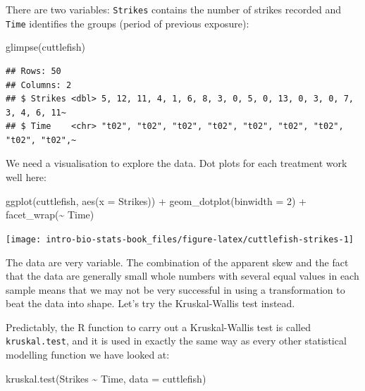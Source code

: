 \documentclass[
]{book}
\newenvironment{Shaded}{\begin{snugshade}}{\end{snugshade}}
\newcommand{\AttributeTok}[1]{\textcolor[rgb]{0.77,0.63,0.00}{#1}}
\newcommand{\DecValTok}[1]{\textcolor[rgb]{0.00,0.00,0.81}{#1}}
\newcommand{\FunctionTok}[1]{\textcolor[rgb]{0.00,0.00,0.00}{#1}}
\newcommand{\NormalTok}[1]{#1}
\newcommand{\SpecialCharTok}[1]{\textcolor[rgb]{0.00,0.00,0.00}{#1}}
\begin{document}
There are two variables: \texttt{Strikes} contains the number of strikes recorded and \texttt{Time} identifies the groups (period of previous exposure):

\begin{Shaded}
\begin{Highlighting}[]
\FunctionTok{glimpse}\NormalTok{(cuttlefish)}
\end{Highlighting}
\end{Shaded}

\begin{verbatim}
## Rows: 50
## Columns: 2
## $ Strikes <dbl> 5, 12, 11, 4, 1, 6, 8, 3, 0, 5, 0, 13, 0, 3, 0, 7, 3, 4, 6, 11~
## $ Time    <chr> "t02", "t02", "t02", "t02", "t02", "t02", "t02", "t02", "t02",~
\end{verbatim}

We need a visualisation to explore the data. Dot plots for each treatment work well here:

\begin{Shaded}
\begin{Highlighting}[]
\FunctionTok{ggplot}\NormalTok{(cuttlefish, }\FunctionTok{aes}\NormalTok{(}\AttributeTok{x =}\NormalTok{ Strikes)) }\SpecialCharTok{+} 
  \FunctionTok{geom\_dotplot}\NormalTok{(}\AttributeTok{binwidth =} \DecValTok{2}\NormalTok{) }\SpecialCharTok{+} \FunctionTok{facet\_wrap}\NormalTok{(}\SpecialCharTok{\textasciitilde{}}\NormalTok{ Time)}
\end{Highlighting}
\end{Shaded}

\begin{center}\texttt{[image: intro-bio-stats-book\_files/figure-latex/cuttlefish-strikes-1]} \end{center}

The data are very variable. The combination of the apparent skew and the fact that the data are generally small whole numbers with several equal values in each sample means that we may not be very successful in using a transformation to beat the data into shape. Let's try the Kruskal-Wallis test instead.

Predictably, the R function to carry out a Kruskal-Wallis test is called \texttt{kruskal.test}, and it is used in exactly the same way as every other statistical modelling function we have looked at:

\begin{Shaded}
\begin{Highlighting}[]
\FunctionTok{kruskal.test}\NormalTok{(Strikes }\SpecialCharTok{\textasciitilde{}}\NormalTok{ Time, }\AttributeTok{data =}\NormalTok{ cuttlefish)}
\end{Highlighting}
\end{Shaded}
\end{document}
